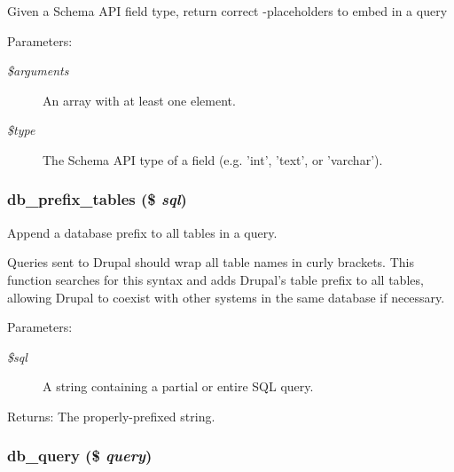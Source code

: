 Given a Schema API field type, return correct -placeholders to embed in a query

\begin{Desc}
\item[Parameters:]
\begin{description}
\item[{\em \$arguments}]An array with at least one element. \item[{\em \$type}]The Schema API type of a field (e.g. 'int', 'text', or 'varchar'). \end{description}
\end{Desc}
\hypertarget{group__database_gdb274339376ae7e48e3ea4da4c1de0b1}{
\subsubsection[{db\_\-prefix\_\-tables}]{\setlength{\rightskip}{0pt plus 5cm}db\_\-prefix\_\-tables (\$ {\em sql})}}
\label{group__database_gdb274339376ae7e48e3ea4da4c1de0b1}


Append a database prefix to all tables in a query.

Queries sent to Drupal should wrap all table names in curly brackets. This function searches for this syntax and adds Drupal's table prefix to all tables, allowing Drupal to coexist with other systems in the same database if necessary.

\begin{Desc}
\item[Parameters:]
\begin{description}
\item[{\em \$sql}]A string containing a partial or entire SQL query. \end{description}
\end{Desc}
\begin{Desc}
\item[Returns:]The properly-prefixed string. \end{Desc}
\hypertarget{group__database_g9e096321b86945d128746ac7bedce8f3}{
\subsubsection[{db\_\-query}]{\setlength{\rightskip}{0pt plus 5cm}db\_\-query (\$ {\em query})}}
\label{group__database_g9e096321b86945d128746ac7bedce8f3}


